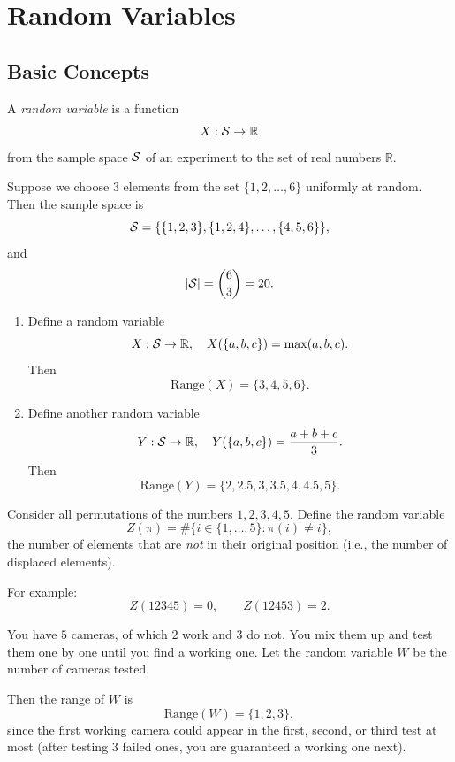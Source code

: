 \chapter{Random Variables}
\addtolength{\topmargin}{-0.9pt}

\section{Basic Concepts}

\begin{definition}
A \emph{random variable} is a function 
\[
X : \mathcal{S} \to \mathbb{R}
\]
from the sample space \( \mathcal{S} \) of an experiment to the set of real numbers \( \mathbb{R} \).
\end{definition}

\begin{eg}
Suppose we choose \(3\) elements from the set \(\{1,2,\dots,6\}\) uniformly at random.  
Then the sample space is 
\[
\mathcal{S} = \{ \{1,2,3\}, \{1,2,4\}, \dots, \{4,5,6\} \},
\]
and 
\[
|\mathcal{S}| = \binom{6}{3} = 20.
\]

\begin{enumerate}[label=(\alph*)]
    \item Define a random variable 
    \[
    X : \mathcal{S} \to \mathbb{R}, \quad X(\{a,b,c\}) = \max(a,b,c).
    \]
    Then 
    \[
    \text{Range}(X) = \{3,4,5,6\}.
    \]
    
    \item Define another random variable 
    \[
    Y : \mathcal{S} \to \mathbb{R}, \quad Y(\{a,b,c\}) = \frac{a+b+c}{3}.
    \]
    Then 
    \[
    \text{Range}(Y) = \{2, 2.5, 3, 3.5, 4, 4.5, 5\}.
    \]
\end{enumerate}
\end{eg}

\begin{eg}
Consider all permutations of the numbers \(1,2,3,4,5\).  
Define the random variable
\[
Z(\pi) = \#\{ i \in \{1,\dots,5\} : \pi(i) \neq i \},
\]
the number of elements that are \emph{not} in their original position (i.e., the number of displaced elements).

For example:
\[
Z(12345) = 0, \qquad Z(12453) = 2.
\]
\end{eg}

\begin{eg}
You have \(5\) cameras, of which \(2\) work and \(3\) do not.  
You mix them up and test them one by one until you find a working one.  
Let the random variable \(W\) be the number of cameras tested.

Then the range of \(W\) is
\[
\text{Range}(W) = \{1,2,3\},
\]
since the first working camera could appear in the first, second, or third test at most (after testing 3 failed ones, you are guaranteed a working one next).
\end{eg}

